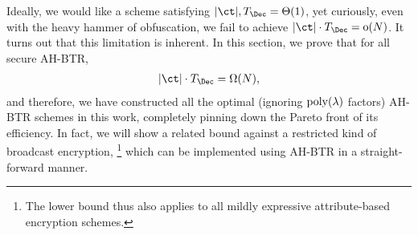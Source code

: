 Ideally,
we would like a scheme satisfying
${|\ct|,T_\Dec=\bigTheta(1)}$,
yet curiously, even with the heavy hammer of obfuscation,
we fail to achieve
${|\ct|\cdot T_\Dec=\smallo(N)}$.
It turns out that this limitation is inherent.
In this section, we prove that for all secure AH-BTR,
\begin{align*}
|\ct|\cdot T_\Dec=\bigOmega(N),
\end{align*}
and therefore, we have constructed all the optimal (ignoring $\operatorname{poly}(\lambda)$ factors) AH-BTR schemes in this work, completely pinning down the Pareto front of its efficiency.
In fact, we will show a related bound against a restricted kind of broadcast encryption,%
\footnote{The lower bound thus also applies to
all mildly expressive attribute-based encryption schemes.}
which can be implemented using AH-BTR in a straight-forward manner.

